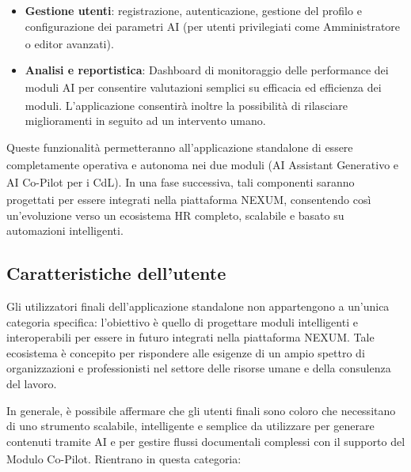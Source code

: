 ﻿\documentclass[a4paper,11pt]{article}
\begin{document}
\begin{itemize}
    \item \textbf{Gestione utenti}: 
    registrazione, autenticazione, gestione del profilo e configurazione dei parametri AI\textsubscript{} 
    (per utenti privilegiati come Amministratore\textsubscript{} o editor avanzati).
    \item \textbf{Analisi e reportistica}:
    Dashboard\textsubscript{} di monitoraggio delle performance dei moduli AI\textsubscript{} per consentire valutazioni semplici su efficacia\textsubscript{} ed efficienza\textsubscript{} dei moduli. L'applicazione consentirà inoltre
    la possibilità di rilasciare miglioramenti in seguito ad un intervento umano. 
\end{itemize}

Queste funzionalità\textsubscript{} permetteranno all'applicazione standalone di essere completamente operativa e autonoma nei due moduli (AI Assistant\textsubscript{} Generativo e AI Co-Pilot\textsubscript{} per i CdL\textsubscript{}). 
In una fase successiva, tali componenti saranno progettati per essere integrati nella piattaforma NEXUM, 
consentendo così un'evoluzione verso un ecosistema HR completo, scalabile e basato su automazioni intelligenti.

\newpage

\subsection{Caratteristiche dell'utente}


Gli utilizzatori finali dell'applicazione standalone non appartengono a un'unica categoria specifica: 
l'obiettivo è quello di progettare moduli intelligenti e interoperabili per essere in futuro integrati nella piattaforma NEXUM. Tale ecosistema è concepito per rispondere alle esigenze di un ampio spettro di organizzazioni e professionisti nel settore delle risorse umane e della consulenza del lavoro.

In generale, è possibile affermare che gli utenti finali sono coloro che necessitano di uno strumento scalabile, 
intelligente e semplice da utilizzare per generare contenuti tramite AI\textsubscript{} e per gestire flussi documentali complessi con il supporto del Modulo\textsubscript{} Co-Pilot\textsubscript{}.
Rientrano in questa categoria:
\end{document}

